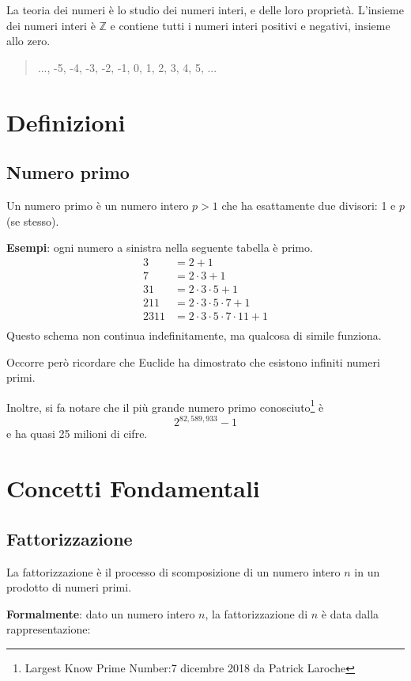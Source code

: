 \documentclass[a4paper,12pt]{report}
\begin{document}
La teoria dei numeri è lo studio dei numeri interi, e delle loro proprietà. L'insieme dei numeri interi è $\mathbb{Z}$ e contiene tutti i numeri interi positivi e negativi, insieme allo zero.
\begin{quote}
	\centering
	..., -5, -4, -3, -2, -1,  0,  1,  2,  3,  4,  5, ...
\end{quote}

\section{Definizioni}

\subsection*{Numero primo}
Un numero primo è un numero intero \( p > 1 \) che ha esattamente due divisori: 1 e \(p\) (se stesso).

\textbf{Esempi}: ogni numero a sinistra nella seguente tabella è primo.
\[\begin{array}{ll}
3 & = 2 + 1 \\
7 & = 2 \cdot 3 + 1 \\
31 & = 2 \cdot 3 \cdot 5 + 1 \\
211 & = 2 \cdot 3 \cdot 5 \cdot 7 + 1 \\
2311 & = 2 \cdot 3 \cdot 5 \cdot 7 \cdot 11 + 1 \\
\end{array}\]
Questo schema non continua indefinitamente, ma qualcosa di simile funziona.

Occorre però ricordare che Euclide ha dimostrato che esistono infiniti numeri primi. \cite{stein2008}

Inoltre, si fa notare che il più grande numero primo conosciuto\footnote{Largest Know Prime Number:7 dicembre 2018 da Patrick Laroche} è \[2^{82,589,933} - 1\]
e ha quasi 25 milioni di cifre.

\section{Concetti Fondamentali}
\subsection*{Fattorizzazione}
La fattorizzazione è il processo di scomposizione di un numero intero \( n \) in un prodotto di numeri primi. 

\textbf{Formalmente}: dato un numero intero \( n \), la fattorizzazione di \( n \) è data dalla rappresentazione: 
\end{document}
